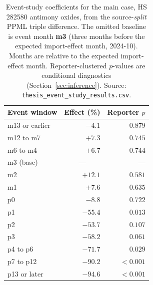 \begin{table}[H]
\centering
\caption{Event-study coefficients for the main case, HS 282580 antimony
oxides, from the source-\emph{split} PPML triple difference. The omitted
baseline is event month \textbf{m3} (three months before the expected
import-effect month, 2024-10). Months are relative to the expected
import-effect month. Reporter-clustered $p$-values are conditional
diagnostics (Section~\ref{sec:inference}). Source:
\texttt{thesis\_event\_study\_results.csv}.}
\label{tab:eventstudy}
\footnotesize
\begin{tabular}{lrr}
\toprule
Event window & Effect (\%) & Reporter $p$ \\
\midrule
m13 or earlier           & $-4.1$ & $0.879$ \\
m12 to m7                & $+7.3$ & $0.745$ \\
m6 to m4                 & $+6.7$ & $0.744$ \\
m3 (base)                & \multicolumn{1}{c}{---} & --- \\
m2                       & $+12.1$ & $0.581$ \\
m1                       & $+7.6$ & $0.635$ \\
p0                       & $-8.8$ & $0.722$ \\
p1                       & $-55.4$ & $0.013$ \\
p2                       & $-53.7$ & $0.107$ \\
p3                       & $-58.2$ & $0.061$ \\
p4 to p6                 & $-71.7$ & $0.029$ \\
p7 to p12                & $-90.2$ & $<0.001$ \\
p13 or later             & $-94.6$ & $<0.001$ \\
\bottomrule
\end{tabular}
\end{table}
